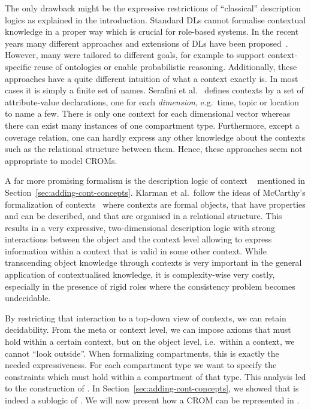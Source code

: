 The only drawback might be the expressive restrictions of ``classical'' description logics as
explained in the introduction. Standard DLs cannot formalise contextual knowledge in a proper way
which is crucial for role-based systems.  In the recent years many different approaches and
extensions of DLs have been proposed~\cite{BoGH-ISWC03, BoGH-WS04, BeAF-ADVIS06, BaVS-ModOnt09, BaKP-JWS12,
  CePe-IJCAR14, CePe-JAR17}.  However, many were tailored to different goals, for example to support
context-specific reuse of ontologies or enable probabilistic reasoning. Additionally, these
approaches have a quite different intuition of what a context exactly is. In most cases it is simply
a finite set of names.  Serafini et al.~\cite{SeHo-JWS12} defines contexts by a set of
attribute-value declarations, one for each \emph{dimension}, e.g.\ time, topic or location to name a
few. There is only one context for each dimensional vector whereas there can exist many instances
of one compartment type.  Furthermore, except a coverage relation, one can hardly express any other
knowledge about the contexts such as the relational structure between them.  Hence, these
approaches seem not appropriate to model CROMs.

A far more promising formalism is the description logic of context \klarALC~\cite{KG-JELIA10, KG16}
mentioned in Section~\ref{sec:adding-cont-concepts}. Klarman et al.\ follow the ideas of McCarthy's
formalization of contexts~\cite{McC-ACM87,McC-IJCAI93} where contexts are formal objects, that have
properties and can be described, and that are organised in a relational structure.  This results in
a very expressive, two-dimensional description logic with strong interactions between the object and
the context level allowing to express information within a context that is valid in some other
context.  While transcending object knowledge through contexts is very important in the general
application of contextualised knowledge, it is complexity-wise very costly, especially in the
presence of rigid roles where the consistency problem becomes undecidable.

By restricting that interaction to a top-down view of contexts, we can retain decidability. From the
meta or context level, we can impose axioms that must hold within a certain context, but on the object
level, i.e.\ within a context, we cannot ``look outside''.
%
When formalizing compartments, this is exactly the needed expressiveness. For each compartment type
we want to specify the constraints which must hold within a compartment of that type.
%
This analysis led to the construction of \LMLO.
In Section~\ref{sec:adding-cont-concepts}, we showed that \ALCALC is indeed a sublogic of \klarALC.
We will now present how a CROM can be represented in \LMLO.


